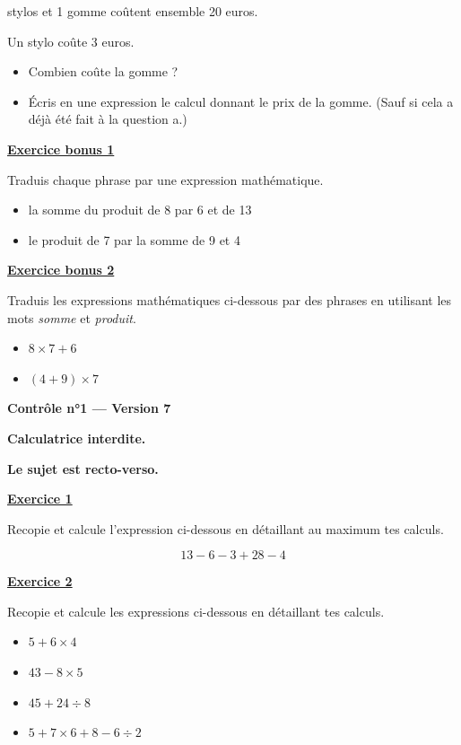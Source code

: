 \documentclass[13pt]{extarticle}
\newcommand{\exo}[1]{%
  \vspace{0.8em}%
  \noindent\large\underline{\textbf{Exercice #1}}%
  \vspace{0.2em}\par%
}
\newcommand{\exobonus}[1]{%
  \vspace{0.8em}%
  \noindent\large\underline{\textbf{Exercice bonus #1}}%
  \vspace{0.2em}\par%
}
\newcommand{\entetecontrole}[1]{%
\begin{center}
\textbf{\huge{Contrôle n°1 --- Version #1}}
\end{center}

\begin{center}
\textbf{Calculatrice interdite.}\par
\textbf{Le sujet est recto-verso.}

\end{center}
}
\begin{document}
 stylos et 1 gomme coûtent ensemble 20 euros.

\noindent Un stylo coûte 3 euros.

\begin{itemize}
  \item[a)] Combien coûte la gomme ?
  \item[b)] Écris en une expression le calcul donnant le prix de la gomme. (Sauf si cela a déjà été fait à la question a.)
\end{itemize}

\exobonus{1}

\noindent Traduis chaque phrase par une expression mathématique.

\begin{itemize}
  \item[a)] la somme du produit de 8 par 6 et de 13
  \item[b)] le produit de 7 par la somme de 9 et 4
\end{itemize}

\exobonus{2}

\noindent Traduis les expressions mathématiques ci-dessous par des phrases en utilisant les mots \emph{somme} et \emph{produit}.

\begin{itemize}
  \item[a)] $8 \times 7 + 6$
  \item[b)] $(4 + 9) \times 7$
\end{itemize}

\newpage

\entetecontrole{7}
\exo{1}

\noindent Recopie et calcule l'expression ci-dessous en détaillant au maximum tes calculs.

\[
13 - 6 - 3 + 28 - 4
\]

\exo{2}

\noindent Recopie et calcule les expressions ci-dessous en détaillant tes calculs.

\begin{itemize}
  \item[a)] $5 + 6 \times 4$
  \item[b)] $43 - 8 \times 5$
  \item[c)] $45 + 24 \div 8$
  \item[d)] $5 + 7 \times 6 + 8 - 6 \div 2$
\end{itemize}
\end{document}
